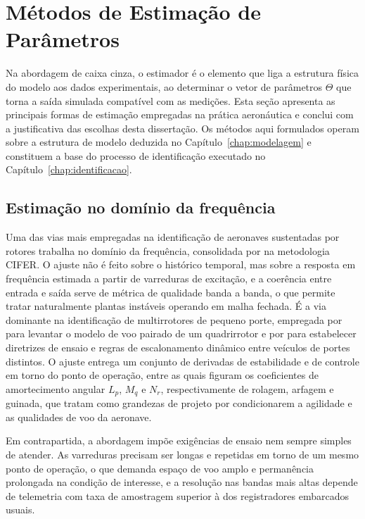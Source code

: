 {\color{blue}
\section[{\color{blue}Métodos de Estimação de Parâmetros}]{Métodos de Estimação de Parâmetros}
\label{sec:estado-arte-metodos}

Na abordagem de caixa cinza, o estimador é o elemento que liga a estrutura física do modelo aos dados experimentais, ao determinar o vetor de parâmetros $\Theta$ que torna a saída simulada compatível com as medições. Esta seção apresenta as principais formas de estimação empregadas na prática aeronáutica e conclui com a justificativa das escolhas desta dissertação. Os métodos aqui formulados operam sobre a estrutura de modelo deduzida no Capítulo~\ref{chap:modelagem} e constituem a base do processo de identificação executado no Capítulo~\ref{chap:identificacao}.

\subsection[{\color{blue}Estimação no domínio da frequência}]{{\color{blue}Estimação no domínio da frequência}}
\label{sec:met-frequencia}

Uma das vias mais empregadas na identificação de aeronaves sustentadas por rotores trabalha no domínio da frequência, consolidada por \textcite{Tischler2012} na metodologia CIFER. O ajuste não é feito sobre o histórico temporal, mas sobre a resposta em frequência estimada a partir de varreduras de excitação, e a coerência entre entrada e saída serve de métrica de qualidade banda a banda, o que permite tratar naturalmente plantas instáveis operando em malha fechada. É a via dominante na identificação de multirrotores de pequeno porte, empregada por \textcite{Wei2017} para levantar o modelo de voo pairado de um quadrirrotor e por \textcite{Ivler2019} para estabelecer diretrizes de ensaio e regras de escalonamento dinâmico entre veículos de portes distintos. O ajuste entrega um conjunto de derivadas de estabilidade e de controle em torno do ponto de operação, entre as quais figuram os coeficientes de amortecimento angular $L_p$, $M_q$ e $N_r$, respectivamente de rolagem, arfagem e guinada, que \textcite{Malpica2024} tratam como grandezas de projeto por condicionarem a agilidade e as qualidades de voo da aeronave.

Em contrapartida, a abordagem impõe exigências de ensaio nem sempre simples de atender. As varreduras precisam ser longas e repetidas em torno de um mesmo ponto de operação, o que demanda espaço de voo amplo e permanência prolongada na condição de interesse, e a resolução nas bandas mais altas depende de telemetria com taxa de amostragem superior à dos registradores embarcados usuais.

}
